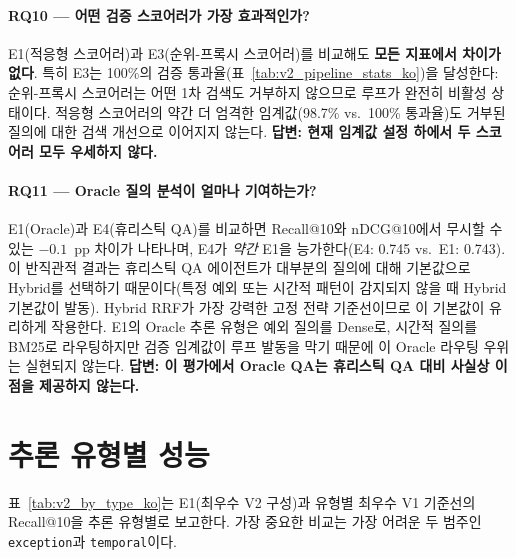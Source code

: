 \paragraph{RQ10 --- 어떤 검증 스코어러가 가장 효과적인가?}

E1(적응형 스코어러)과 E3(순위-프록시 스코어러)를 비교해도 \textbf{모든 지표에서 차이가 없다}. 특히 E3는 100\%의 검증 통과율(표~\ref{tab:v2_pipeline_stats_ko})을 달성한다: 순위-프록시 스코어러는 어떤 1차 검색도 거부하지 않으므로 루프가 완전히 비활성 상태이다. 적응형 스코어러의 약간 더 엄격한 임계값(98.7\% vs.\ 100\% 통과율)도 거부된 질의에 대한 검색 개선으로 이어지지 않는다. \textbf{답변: 현재 임계값 설정 하에서 두 스코어러 모두 우세하지 않다.}

\paragraph{RQ11 --- Oracle 질의 분석이 얼마나 기여하는가?}

E1(Oracle)과 E4(휴리스틱 QA)를 비교하면 Recall@10와 nDCG@10에서 무시할 수 있는 $-0.1$~pp 차이가 나타나며, E4가 \emph{약간} E1을 능가한다(E4: 0.745 vs.\ E1: 0.743). 이 반직관적 결과는 휴리스틱 QA 에이전트가 대부분의 질의에 대해 기본값으로 Hybrid를 선택하기 때문이다(특정 예외 또는 시간적 패턴이 감지되지 않을 때 Hybrid 기본값이 발동). Hybrid RRF가 가장 강력한 고정 전략 기준선이므로 이 기본값이 유리하게 작용한다. E1의 Oracle 추론 유형은 예외 질의를 Dense로, 시간적 질의를 BM25로 라우팅하지만 검증 임계값이 루프 발동을 막기 때문에 이 Oracle 라우팅 우위는 실현되지 않는다. \textbf{답변: 이 평가에서 Oracle QA는 휴리스틱 QA 대비 사실상 이점을 제공하지 않는다.}


\section{추론 유형별 성능}
\label{sec:v2_by_type_ko}

표~\ref{tab:v2_by_type_ko}는 E1(최우수 V2 구성)과 유형별 최우수 V1 기준선의 Recall@10을 추론 유형별로 보고한다. 가장 중요한 비교는 가장 어려운 두 범주인 \texttt{exception}과 \texttt{temporal}이다.

